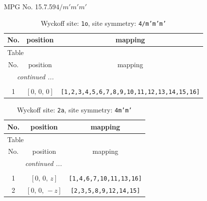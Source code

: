 \documentclass[fleqn,8pt]{jsarticle}
\begin{document}
\setcounter{MaxMatrixCols}{32}

\renewcommand{\tablename}{Table~}
\renewcommand{\figurename}{Figure~}
\begin{center}
\LARGE
MPG No. 15.7.59\quad$4/m'm'm'$
\end{center}
\renewcommand{\arraystretch}{1.2}
\begin{longtable}{ccc}
\caption{Wyckoff site: {\tt 1o}, site symmetry: {\tt 4/m'm'm'}}
 \\
 \hline \hline
No. & position & mapping \\ \hline \endfirsthead

\multicolumn{2}{l}{\tablename\ \thetable{}} \\
 \hline \hline
No. & position & mapping \\ \hline \endhead

 \hline \hline
\multicolumn{2}{r}{\footnotesize\it continued ...} \\ \endfoot

 \hline \hline
\multicolumn{2}{r}{} \\ \endlastfoot

1 & $\left[ 0,\, 0,\, 0 \right]$ & {\tt [1,2,3,4,5,6,7,8,9,10,11,12,13,14,15,16]} \\
\end{longtable}
\renewcommand{\arraystretch}{1.2}
\begin{longtable}{ccc}
\caption{Wyckoff site: {\tt 2a}, site symmetry: {\tt 4m'm'}}
 \\
 \hline \hline
No. & position & mapping \\ \hline \endfirsthead

\multicolumn{2}{l}{\tablename\ \thetable{}} \\
 \hline \hline
No. & position & mapping \\ \hline \endhead

 \hline \hline
\multicolumn{2}{r}{\footnotesize\it continued ...} \\ \endfoot

 \hline \hline
\multicolumn{2}{r}{} \\ \endlastfoot

1 & $\left[ 0,\, 0,\, z \right]$ & {\tt [1,4,6,7,10,11,13,16]} \\ \hline
2 & $\left[ 0,\, 0,\, - z \right]$ & {\tt [2,3,5,8,9,12,14,15]} \\
\end{longtable}
\renewcommand{\arraystretch}{1.2}
\end{document}
